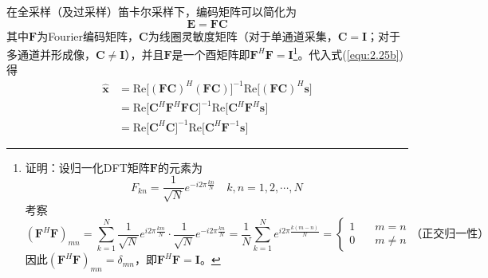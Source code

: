 \documentclass[12pt]{article}
\begin{document}
在全采样（及过采样）笛卡尔采样下，编码矩阵可以简化为
\begin{equation}
    \mathbf{E}=\mathbf{F}\mathbf{C}
\end{equation}
其中$\mathbf{F}$为Fourier编码矩阵，$\mathbf{C}$为线圈灵敏度矩阵（对于单通道采集，$\mathbf{C}=\mathbf{I}$；对于多通道并形成像，$\mathbf{C}\neq\mathbf{I}$），并且$\mathbf{F}$是一个酉矩阵即$\mathbf{F}^H\mathbf{F}=\mathbf{I}$\footnote{证明：设归一化DFT矩阵$\mathbf{F}$的元素为
\begin{equation}
    F_{kn}=\frac{1}{\sqrt{N}}e^{-i2\pi\frac{kn}{N}}\quad k,n=1,2,\cdots,N
\end{equation}
考察
\begin{equation}
    (\mathbf{F}^H\mathbf{F})_{mn}=\sum_{k=1}^{N} \frac{1}{\sqrt{N}}e^{i2\pi\frac{km}{N}}\cdot\frac{1}{\sqrt{N}}e^{-i2\pi\frac{kn}{N}}=\frac{1}{N}\sum_{k=1}^{N} e^{i2\pi\frac{k(m-n)}{N}}=
    \begin{cases} 1&\quad m=n \\ 0&\quad m\neq n \end{cases}
    \text{（正交归一性）}
\end{equation}
因此$(\mathbf{F}^H\mathbf{F})_{mn}=\delta_{mn}$，即$\mathbf{F}^H\mathbf{F}=\mathbf{I}$。}。代入式(\autoref{equ:2.25b})得
\begin{equation}
    \begin{aligned}
        \hat{\bm{x}}
        &=\mathrm{Re}\bigg[(\mathbf{F}\mathbf{C})^H(\mathbf{F}\mathbf{C})\bigg]^{-1}\mathrm{Re}\bigg[(\mathbf{F}\mathbf{C})^H\bm{s}\bigg] \\
        &=\mathrm{Re}\bigg[\mathbf{C}^H\mathbf{F}^H\mathbf{F}\mathbf{C}\bigg]^{-1}\mathrm{Re}\bigg[\mathbf{C}^H\mathbf{F}^H\bm{s}\bigg] \\
        &=\mathrm{Re}\bigg[\mathbf{C}^H\mathbf{C}\bigg]^{-1}\mathrm{Re}\bigg[\mathbf{C}^H\mathbf{F}^{-1}\bm{s}\bigg]
        \label{equ:2.26}
    \end{aligned}
\end{equation}
\end{document}
